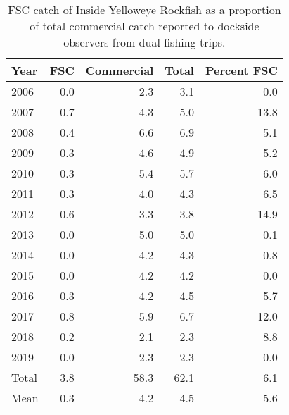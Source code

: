 \documentclass[11pt]{book}
\begin{document}
\clearpage
\begin{longtable}[t]{lrrrr}
\caption{\label{tab:fsc-catch}FSC catch of Inside Yelloweye Rockfish as a proportion of total commercial catch reported to dockside observers from dual fishing trips.}\\
\toprule
\textbf{Year} & \textbf{FSC} & \textbf{Commercial} & \textbf{Total} & \textbf{Percent FSC}\\
\midrule
2006 & 0.0 & 2.3 & 3.1 & 0.0\\
2007 & 0.7 & 4.3 & 5.0 & 13.8\\
2008 & 0.4 & 6.6 & 6.9 & 5.1\\
2009 & 0.3 & 4.6 & 4.9 & 5.2\\
2010 & 0.3 & 5.4 & 5.7 & 6.0\\
2011 & 0.3 & 4.0 & 4.3 & 6.5\\
2012 & 0.6 & 3.3 & 3.8 & 14.9\\
2013 & 0.0 & 5.0 & 5.0 & 0.1\\
2014 & 0.0 & 4.2 & 4.3 & 0.8\\
2015 & 0.0 & 4.2 & 4.2 & 0.0\\
2016 & 0.3 & 4.2 & 4.5 & 5.7\\
2017 & 0.8 & 5.9 & 6.7 & 12.0\\
2018 & 0.2 & 2.1 & 2.3 & 8.8\\
2019 & 0.0 & 2.3 & 2.3 & 0.0\\
Total & 3.8 & 58.3 & 62.1 & 6.1\\
Mean & 0.3 & 4.2 & 4.5 & 5.6\\
\bottomrule
\end{longtable}
\clearpage
\end{document}
